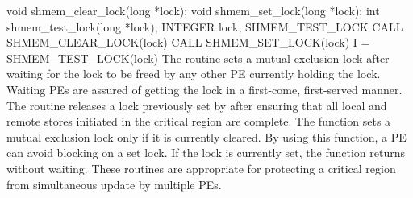 \synC
void shmem_clear_lock(long *lock);
void shmem_set_lock(long *lock);
int shmem_test_lock(long *lock);
\synF   %
INTEGER lock, SHMEM_TEST_LOCK
CALL SHMEM_CLEAR_LOCK(lock)
CALL SHMEM_SET_LOCK(lock)
I = SHMEM_TEST_LOCK(lock)
{
       The  routine sets a mutual exclusion lock after  waiting
       for  the lock  to be freed by any other \ac{PE} currently holding the lock.
       Waiting \ac{PE}s  are  assured  of  getting	the  lock  in  a  first-come,
       first-served manner.  The   routine releases  a  lock  previously  set  by
         after  ensuring that  all  local  and  remote	 stores
       initiated in the critical region are complete. The  function sets a mutual exclusion lock only if it is
       currently cleared.  By using this function, a \ac{PE} can avoid blocking  on
       a set lock.  If the lock is currently set, the function returns without
       waiting. These routines are appropriate for protecting a critical region from
       simultaneous  update  by multiple  \ac{PE}s.	  
}
{

}

\eAPI